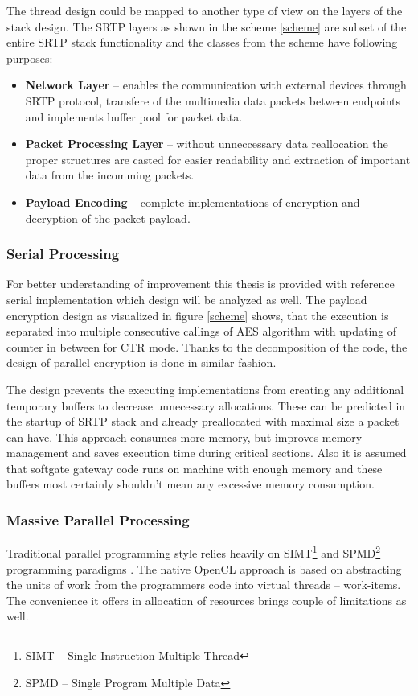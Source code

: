 The thread design could be mapped to another type of view on the layers of
the stack design. The SRTP layers as shown in the scheme \ref{scheme} are subset
of the entire SRTP stack functionality and the classes from the scheme have 
following purposes:

\begin{itemize}
\item \textbf{Network Layer} -- enables the communication with external devices
through SRTP protocol, transfere of the multimedia data packets between endpoints
and implements buffer pool for packet data.  
\item \textbf{Packet Processing Layer} -- without unneccessary data reallocation
the proper structures are casted for easier readability and extraction of important
data from the incomming packets. 
\item \textbf{Payload Encoding} -- complete implementations of encryption and 
decryption of the packet payload.
\end{itemize}

\subsubsection*{Serial Processing}
For better understanding of improvement this thesis is provided with reference
serial implementation which design will be analyzed as well. The payload 
encryption design as visualized in figure \ref{scheme} shows, that the execution
is separated into multiple consecutive callings of AES algorithm with updating
of counter in between for CTR mode. Thanks to the decomposition of the code,
the design of parallel encryption is done in similar fashion.

The design prevents the executing implementations from creating any additional
temporary buffers to decrease unnecessary allocations. These can be predicted in
the startup of SRTP stack and already preallocated with maximal size a packet
can have. This approach consumes more memory, but improves memory management and
saves execution time during critical sections. Also it is assumed that softgate
gateway code runs on machine with enough memory and these buffers most certainly
shouldn't mean any excessive memory consumption.     

\subsubsection*{Massive Parallel Processing}
Traditional parallel programming style relies heavily on SIMT\footnote{ SIMT -- 
Single Instruction Multiple Thread} and SPMD\footnote{ SPMD -- Single Program
Multiple Data} programming paradigms \cite{Flynn:1972}. The native OpenCL 
approach is based on abstracting the units of work from the programmers code 
into virtual threads -- work-items. The convenience it offers in allocation
of resources brings couple of limitations as well. 


